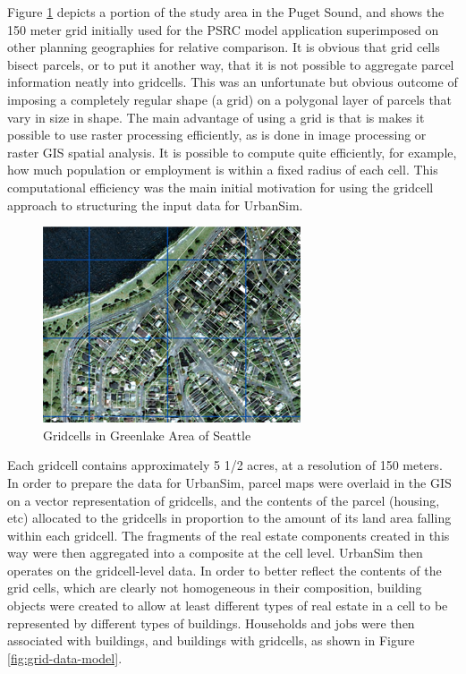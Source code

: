Figure \ref{fig:gridcells} depicts a portion of the study area in the Puget Sound, and shows the 150 meter grid initially used for the PSRC model application
superimposed on other planning geographies for relative comparison.  It is obvious that grid cells bisect parcels, or to put it another way, that it is not possible to aggregate parcel information neatly into gridcells.  This was an unfortunate but obvious outcome of imposing a completely regular shape (a grid) on a polygonal layer of parcels that vary in size in shape.  The main advantage of using a grid is that is makes it possible
to use raster processing efficiently, as is done in image processing or raster GIS spatial analysis.  It is possible to compute quite efficiently, for example, how much population or employment is within a fixed radius of each cell.  This computational efficiency was the main initial motivation for using the gridcell approach to structuring the input data for UrbanSim.

\begin{figure}[htp]
\begin{center}
\includegraphics[scale=1.25]{graphics/gridmap-small.png}
\end{center}
\caption{Gridcells in Greenlake Area of Seattle}
\label{fig:gridcells}
\end{figure}

Each gridcell contains approximately 5 1/2 acres, at a resolution of 150 meters.  In order to prepare the data for UrbanSim, parcel maps were overlaid in the GIS on a vector representation of gridcells, and the contents of the parcel (housing, etc)  allocated to the gridcells in proportion to the amount of its land area falling within each gridcell.  The fragments of the real estate components created in this way were then aggregated into a composite at the cell level.  UrbanSim then operates on the gridcell-level data.  In order to better reflect the contents of the grid cells, which are clearly not homogeneous in their composition, building objects were created to allow at least different types of real estate in a cell to be represented by different types of buildings.  Households and jobs were then associated with buildings, and buildings with gridcells, as shown in Figure \ref{fig:grid-data-model}.

